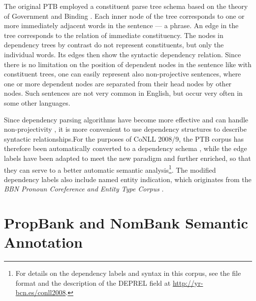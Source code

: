\documentclass[12pt,notitlepage]{report}
\begin{document}
The original PTB employed a constituent parse tree schema based on the theory of Government and Binding \citep{chomsky81}. Each inner node of the tree corresponds to one or more immediately adjacent words in the sentence --- a phrase. An edge in the tree corresponds to the relation of immediate constituency. The nodes in dependency trees by contrast do not represent constituents, but only the individual words. Its edges then show the syntactic dependency relation. Since there is no limitation on the position of dependent nodes in the sentence like with constituent trees, one can easily represent also non-projective sentences, where one or more dependent nodes are separated from their head nodes by other nodes. Such sentences are not very common in English, but occur very often in some other languages.

Since dependency parsing algorithms have become more effective and can handle non-projectivity \citep[cf.][]{mcdonald05}, it is more convenient to use dependency structures to describe syntactic relationships.For the purposes of CoNLL 2008/9, the PTB corpus has therefore been automatically converted to a dependency schema \citep{johansson07,surdeanu08}, while the edge labels have been adapted to meet the new paradigm and further enriched, so that they can serve to a better automatic semantic analysis\footnote{For details on the dependency labels and syntax in this corpus, see the file format and the description of the DEPREL field at \url{http://yr-bcn.es/conll2008}.}. The modified dependency labels also include named entity indication, which originates from the \emph{BBN Pronoun Coreference and Entity Type Corpus} \citep{weischedel05}.

\section{PropBank and NomBank Semantic Annotation}\label{propbank-nombank}
\end{document}
